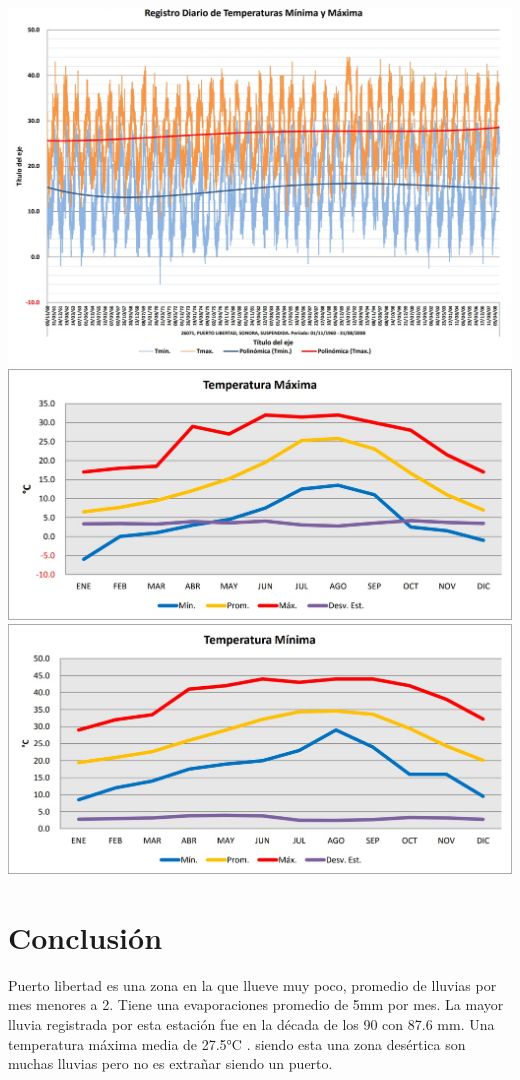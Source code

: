 \documentclass{report}
\begin{document}
\\
\noindent
\includegraphics[width=0.9\linewidth]{5.jpg}
\\
\noindent
\includegraphics[width=0.9\linewidth]{6.jpg}
\\
\noindent
\includegraphics[width=0.9\linewidth]{7.jpg}

\section{Conclusión}
Puerto libertad es una zona en la que llueve muy poco, promedio de lluvias por mes menores a 2. Tiene una evaporaciones promedio de 5mm por mes. La mayor lluvia registrada por esta estación fue en la década de los 90 con 87.6 mm. Una temperatura máxima media de 27.5°C . siendo esta una zona desértica son muchas lluvias pero no es extrañar siendo un puerto.
\end{document}
